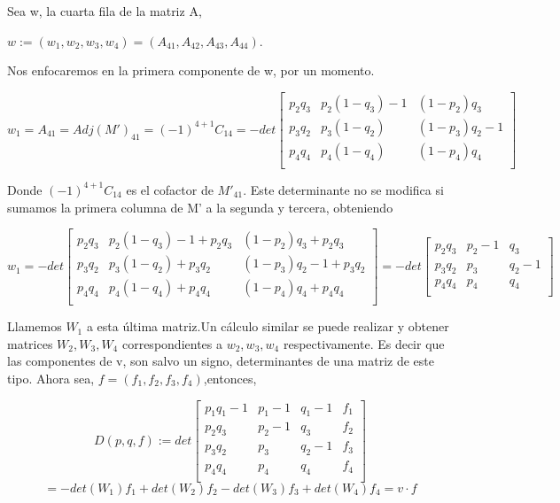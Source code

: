 \documentclass[12pt]{article}
\begin{document}
Sea w, la cuarta fila de la matriz A, 
\begin{center}
$w:=(w_1,w_2,w_3,w_4)=(A_{41},A_{42},A_{43},A_{44})$.
\end{center}
Nos enfocaremos en la primera componente de w, por un momento.
\begin{center}
 $$
 w_1=A_{41}=Adj(M')_{41}=(-1)^{4+1} C_{14}=- det
 \begin{bmatrix}
 p_2 q_3 & p_2(1-q_3)-1 &(1-p_2)q_3 \\
 p_3 q_2 & p_3(1-q_2) &(1-p_3)q_2 -1 \\ 
 p_4 q_4 & p_4(1-q_4) &(1-p_4)q_4 \\ 
 \end{bmatrix}
 $$
 \end{center}
 Donde $(-1)^{4+1} C_{14}$ es el cofactor de $M'_{41}$. Este determinante no se modifica si sumamos la 
 primera columna de M' a la segunda y tercera, obteniendo
 \begin{center}
 $$w_1=- det
 \begin{bmatrix}
 p_2q_3 & p_2(1-q_3)-1+p_2q_3 &(1-p_2)q_3+p_2q_3 \\
 p_3q_2 & p_3(1-q_2)+p_3q_2 &(1-p_3)q_2 -1+p_3q_2 \\ 
 p_4q_4 & p_4(1-q_4)+p_4q_4 &(1-p_4)q_4+p_4q_4 \\ 
 \end{bmatrix}
 =- det
 \begin{bmatrix}
 p_2q_3 & p_2-1 & q_3 \\
 p_3q_2 & p_3 & q_2-1 \\ 
 p_4q_4 & p_4 & q_4 \\ 
 \end{bmatrix} 
 $$
\end{center} 
Llamemos $W_1$ a esta última matriz.Un cálculo similar se puede realizar y obtener matrices $W_2,W_3,W_4$ 
correspondientes a $w_2,w_3,w_4$ respectivamente. Es decir que las componentes de v, son salvo un signo, 
determinantes de una matriz de este tipo.
Ahora sea, $f=(f_1,f_2,f_3,f_4)$,entonces,
\begin{center}
$$
D(p,q,f):=det
\begin{bmatrix}
 p_1q_1-1 & p_1-1 & q_1-1 & f_1 \\
 p_2q_3 & p_2-1 & q_3 & f_2\\
 p_3q_2 & p_3 & q_2-1  & f_3\\ 
 p_4q_4 & p_4 & q_4 & f_4\\ 
 \end{bmatrix} 
 $$
 $$
 =-det(W_1)f_1 +det(W_2)f_2 -det(W_3)f_3 +det(W_4)f_4 
 = v \cdot f
 $$
\end{center}
\end{document}
